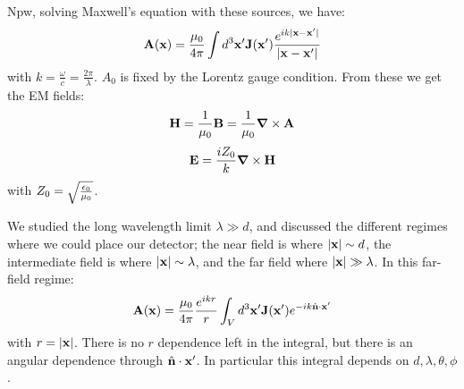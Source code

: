 Npw, solving Maxwell's equation with these sources, we have:
\begin{equation}
    \mathbf{A}(\mathbf{x}) = \frac{\mu_0}{4\pi}\int d^3\mathbf{x}'\mathbf{J}(\mathbf{x}')\frac{e^{ik\lvert \mathbf{x} - \mathbf{x}' \rvert}}{\lvert \mathbf{x} - \mathbf{x}' \rvert}
\end{equation}
with $k = \frac{\omega}{c} = \frac{2\pi}{\lambda}$. $A_0$ is fixed by the Lorentz gauge condition. From these we get the EM fields:
\begin{equation}
    \v{H} = \frac{1}{\mu_0}\v{B} = \frac{1}{\mu_0}\nabla \times \v{A}
\end{equation}
\begin{equation}
    \v{E} = \frac{iZ_0}{k}\nabla \times \v{H}
\end{equation}
with $Z_0 = \sqrt{\frac{\epsilon_0}{\mu_0}}$.

We studied the long wavelength limit $\lambda \gg d$, and discussed the different regimes where we could place our detector; the near field is where $\lvert \mathbf{x} \rvert \sim d$, the intermediate field is where $\lvert \mathbf{x} \rvert \sim \lambda$, and the far field where $\lvert \mathbf{x} \rvert \gg \lambda$. In this far-field regime:
\begin{equation}
    \mathbf{A}(\mathbf{x}) = \frac{\mu_0}{4\pi}\frac{e^{ikr}}{r}\int_V d^3\mathbf{x}'\mathbf{J}(\mathbf{x}')e^{-ik\hat{\mathbf{n}}\cdot\mathbf{x}'}
\end{equation}
with $r = \lvert \mathbf{x} \rvert$. There is no $r$ dependence left in the integral, but there is an angular dependence through $\hat{\mathbf{n}}\cdot\mathbf{x}'$. In particular this integral depends on $d, \lambda, \theta, \phi$.


